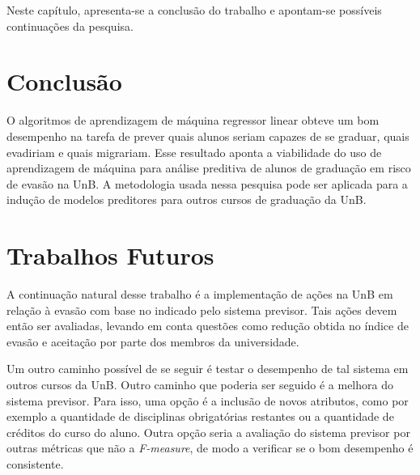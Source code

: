 Neste capítulo, apresenta-se a conclusão do trabalho e apontam-se possíveis continuações da
pesquisa. 

\section{Conclusão}
O algoritmos de aprendizagem de máquina regressor linear obteve um bom desempenho na
tarefa de prever quais alunos seriam capazes de se graduar, quais evadiriam e quais
migrariam. Esse resultado aponta a viabilidade do uso de
aprendizagem de máquina para análise preditiva de alunos de graduação em risco de
evasão na UnB. A metodologia usada nessa pesquisa pode ser aplicada para a indução de
modelos preditores para outros cursos de graduação da UnB. 

\section{Trabalhos Futuros}
A continuação natural desse trabalho é a implementação de ações na UnB em
relação à evasão com base no indicado pelo sistema previsor. Tais ações devem então
ser avaliadas, levando em conta questões como redução obtida no índice de evasão 
e aceitação por parte dos membros da universidade. 
\par Um outro caminho possível de se seguir é testar o desempenho de tal sistema em
outros cursos da UnB. Outro caminho que poderia ser seguido é a melhora do
sistema previsor. Para isso, uma opção é a inclusão de novos atributos, como por
exemplo a quantidade de disciplinas obrigatórias restantes ou a quantidade de
créditos do curso do aluno.  Outra opção seria a avaliação do sistema previsor por
outras métricas que não a \textit{F-measure}, de modo a verificar se o bom desempenho
é consistente. 

%
